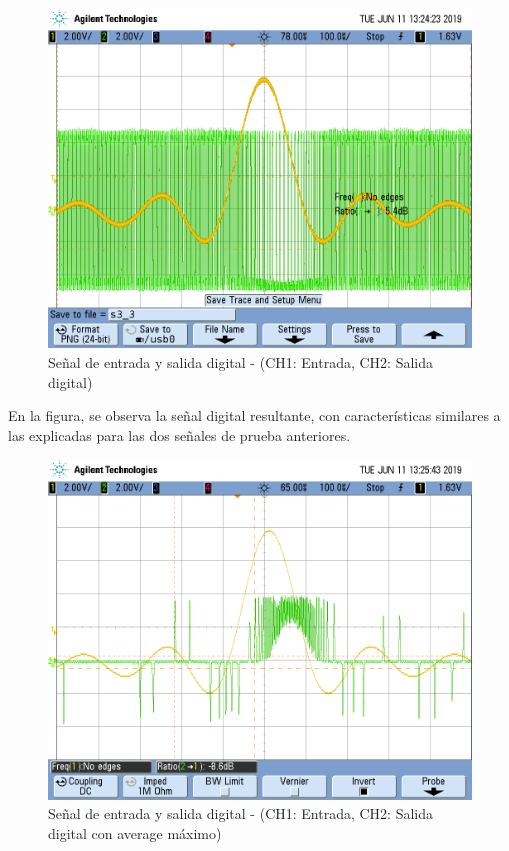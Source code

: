 \documentclass[assd_tp3_main.tex]{subfiles}
\begin{document}

\begin{figure}[!ht]
\begin{centering}
\includegraphics[scale=0.25]{../EJ4/Mediciones/Sinc/s3_3.png}
\par\end{centering}
\caption{Señal de entrada y salida digital - (CH1: Entrada, CH2: Salida digital)}
\end{figure}

En la figura, se observa la señal digital resultante, con características similares a las explicadas para las dos señales de prueba anteriores.

\begin{figure}[!ht]
\begin{centering}
\includegraphics[scale=0.25]{../EJ4/Mediciones/Sinc/s3_4.png}
\par\end{centering}
\caption{Señal de entrada y salida digital - (CH1: Entrada, CH2: Salida digital con average máximo)}
\end{figure}
\end{document}
